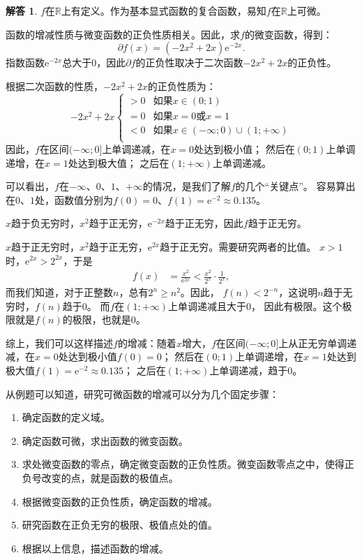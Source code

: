 \documentclass[12pt,UTF8]{ctexbook}
\theoremstyle{definition}
\newtheorem*{so}{解答}
\theoremstyle{plain}
\begin{document}
\begin{so}
    $f$在$\mathbb{R}$上有定义。作为基本显式函数的复合函数，易知$f$在$\mathbb{R}$上可微。

    函数的增减性质与微变函数的正负性质相关。因此，求$f$的微变函数，得到：
    $$ \partial f(x) = (-2x^2 + 2x) \mathrm{e}^{-2x}.$$
    指数函数$ \mathrm{e}^{-2x} $总大于$0$，因此$ \partial f $的正负性取决于二次函数$-2x^2 + 2x$的正负性。
    
    根据二次函数的性质，$-2x^2 + 2x$的正负性质为：
    $$ -2x^2 + 2x \left\{
        \begin{array}{cl}
            > 0 & \mbox{如果}x \in (0; 1) \\
            = 0 & \mbox{如果}x = 0 \mbox{或} x = 1 \\
            < 0 & \mbox{如果}x \in (-\infty; 0)\cup (1; +\infty)\\
        \end{array}\right.
    $$
    因此，$f$在区间$(-\infty; 0]$上单调递减，在$x = 0$处达到极小值；
    然后在$(0; 1)$上单调递增，在$x = 1$处达到极大值；
    之后在$(1; +\infty)$上单调递减。

    可以看出，$f$在$-\infty$、$0$、$1$、$+\infty$的情况，是我们了解$f$的几个“关键点”。
    容易算出在$0$、$1$处，函数值分别为$f(0) = 0$、$f(1) = \mathrm{e}^{-2} \approx 0.135$。
    
    $x$趋于负无穷时，$x^2$趋于正无穷，$\mathrm{e}^{-2x}$趋于正无穷，因此$f$趋于正无穷。

    $x$趋于正无穷时，$x^2$趋于正无穷，$\mathrm{e}^{2x}$趋于正无穷。需要研究两者的比值。
    $x > 1$时，$\mathrm{e}^{2x} > 2^{2x}$，于是
    \begin{align*}
        f(x) &= \frac{x^2}{\mathrm{e}^{2x}} < \frac{x^2}{2^x} \cdot \frac{1}{2^x}, 
    \end{align*} 
    而我们知道，对于正整数$n$，总有$2^n \geqslant n^2$。因此，
    $f(n) < 2^{-n}$，这说明$n$趋于无穷时，$f(n)$趋于$0$。
    而$f$在$(1;+\infty)$上单调递减且大于$0$，
    因此有极限。这个极限就是$f(n)$的极限，也就是$0$。

    综上，我们可以这样描述$f$的增减：随着$x$增大，$f$在区间$(-\infty; 0]$上从正无穷单调递减，在$x = 0$处达到极小值$f(0) = 0$；
    然后在$(0; 1)$上单调递增，在$x = 1$处达到极大值$f(1) = \mathrm{e}^{-2} \approx 0.135$；
    之后在$(1; +\infty)$上单调递减，趋于$0$。
\end{so}

从例题可以知道，研究可微函数的增减可以分为几个固定步骤：
\begin{enumerate}
    \item 确定函数的定义域。
    \item 确定函数可微，求出函数的微变函数。
    \item 求处微变函数的零点，确定微变函数的正负性质。微变函数零点之中，使得正负号改变的点，就是函数的极值点。
    \item 根据微变函数的正负性质，确定函数的增减。
    \item 研究函数在正负无穷的极限、极值点处的值。
    \item 根据以上信息，描述函数的增减。
\end{enumerate}
\end{document}
